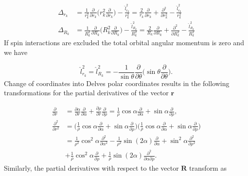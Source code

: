\documentclass{article}
\begin{document}
\begin{subequations}
\begin{align}
	\Delta_{r_{k}} &= \frac{1}{r_{k}^2}\frac{\partial}{\partial r_{k}} \bigg( r_{k}^2 \frac{\partial}{\partial r_{k}} \bigg) - \frac{\hat{l}^2_{r_k}}{r_{k}^2} = \frac{2}{r_{k}}\frac{\partial}{\partial r_{k}} + \frac{\partial^2}{\partial r_{k}^{2}} - \frac{\hat{l}^{2}_{r_k}}{r_{k}^2}\\
	\Delta_{R_{k}} &= \frac{1}{R_{k}^2}\frac{\partial}{\partial R_{k}} \bigg( R_{k}^2 \frac{\partial}{\partial R_{k}} \bigg) - \frac{\hat{l}^2_{R_k}}{R_{k}^2} = \frac{2}{R_{k}}\frac{\partial}{\partial R_{k}} + \frac{\partial^2}{\partial R_{k}^{2}} - \frac{\hat{l}^{2}_{R_k}}{R_{k}^2}
\end{align}
\end{subequations}
If spin interactions are excluded the total orbital angular momentum is zero and we have 

\begin{equation}
\hat{l}^{2}_{r_k} = \hat{l}^{2}_{R_k} = -\frac{1}{\sin{\theta}} \frac{\partial}{\partial{\theta}} \bigg( \sin{\theta} \frac{\partial}{\partial{\theta}} \bigg).
\end{equation}
Change of coordinates into Delves polar coordinates results in the following transformations for the partial derivatives of the vector $\mathbf{r}$

\begin{subequations}
\begin{align}
        \frac{\partial}{\partial r}        &= \frac{\partial\alpha}{\partial r} \frac{\partial}{\partial\alpha} +  \frac{\partial\rho}{\partial r} \frac{\partial}{\partial\rho} = \frac{1}{\rho}\cos{\alpha}\frac{\partial}{\partial \alpha} + \sin{\alpha}\frac{\partial}{\partial \rho}, \\
        \frac{\partial^2}{\partial r^2} &= \bigg( \frac{1}{\rho} \cos\alpha \frac{\partial}{\partial\alpha} + \sin\alpha \frac{\partial}{\partial\rho}\bigg) \bigg( \frac{1}{\rho} \cos\alpha \frac{\partial}{\partial\alpha} + \sin\alpha \frac{\partial}{\partial\rho}\bigg) \nonumber \\
                                                     &= \frac{1}{\rho^2} \cos^2\alpha \frac{\partial^2}{\partial\alpha^{2}} - \frac{1}{\rho^2} \sin(2\alpha) \frac{\partial}{\partial\alpha} + \sin^2\alpha \frac{\partial^2}{\partial\rho^{2}} \nonumber \\
                                                     &+ \frac{1}{\rho} \cos^2\alpha \frac{\partial}{\partial\rho} + \frac{1}{\rho} \sin(2\alpha) \frac{\partial^2}{\partial\alpha \partial\rho}.
\end{align}
\end{subequations}
Similarly, the partial derivatives with respect to the vector $\mathbf{R}$ transform as
\end{document}
